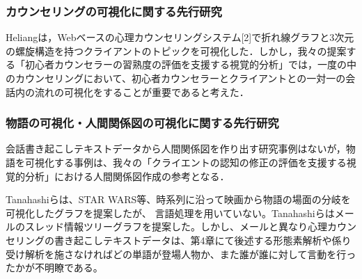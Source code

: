 \documentclass[shuuron]{kuee}
\begin{document}





\subsubsection{カウンセリングの可視化に関する先行研究}%

Heliang\cite{shou}は，Webベースの心理カウンセリングシステム[2]で折れ線グラフと3次元の螺旋構造を持つクライアントのトピックを可視化した．しかし，我々の提案する「初心者カウンセラーの習熟度の評価を支援する視覚的分析」では，一度の中のカウンセリングにおいて、初心者カウンセラーとクライアントとの一対一の会話内の流れの可視化をすることが重要であると考えた．

\subsubsection{物語の可視化・人間関係図の可視化に関する先行研究}%

会話書き起こしテキストデータから人間関係図を作り出す研究事例はないが，物語を可視化する事例は、我々の「クライエントの認知の修正の評価を支援する視覚的分析」における人間関係図作成の参考となる．

Tanahashiら\cite{tanahashi2012design}は、STAR WARS等、時系列に沿って映画から物語の場面の分岐を可視化したグラフを提案したが、
言語処理を用いていない。Tanahashiら\cite{tanahashi2015efficient}はメールのスレッド情報ツリーグラフを提案した。しかし、メールと異なり心理カウンセリングの書き起こしテキストデータは、第4章にて後述する形態素解析や係り受け解析を施さなければどの単語が登場人物か、また誰が誰に対して言動を行ったかが不明瞭である。
\end{document}
